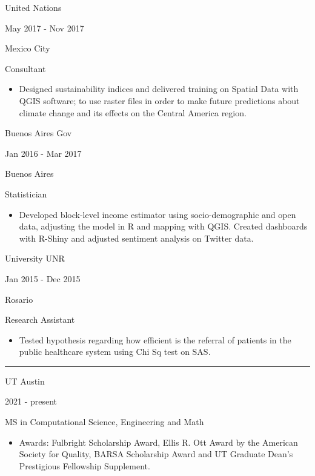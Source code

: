 \documentclass[a4paper,10pt]{article}
\newlength{\cvcolumngapwidth}
\newlength{\cvleftcolumnwidth}
\newlength{\cvrightcolumnwidth}
\newcommand{\cvsectionstyle}[1]{{\normalsize\cvsectionfont\textcolor{cvsectioncolor}{#1}}}
\newcommand{\cvtitlestyle}[1]{{\large\cvtitlefont\textcolor{cvtitlecolor}{#1}}}
\newcommand{\cvdurationstyle}[1]{{\small\cvdurationfont\textcolor{cvdurationcolor}{#1}}}
\newcommand{\cvheadingstyle}[1]{{\normalsize\cvheadingfont\textcolor{cvheadingcolor}{#1}}}
\newlength{\cvafteritemskipamount}
\newlength{\cvaftersectionskipamount}
\newlength{\cvaftertitleskipamount}
\newlength{\cvparskip}
\newcommand{\cvsection}[1]{
    \begin{minipage}[t]{\cvleftcolumnwidth}
        \raggedleft\cvsectionstyle{#1}
    \end{minipage}%
    \hspace{\cvcolumngapwidth}%
    \begin{minipage}[t]{\cvrightcolumnwidth}
        \textcolor{cvrulecolor}{\rule{\cvrightcolumnwidth}{0.3mm}}
    \end{minipage}

    \vspace{\cvaftersectionskipamount}
}
\newcommand{\cvitem}[2]{
    \begin{minipage}[t]{\cvleftcolumnwidth}
        \raggedleft #1
    \end{minipage}%
    \hspace{\cvcolumngapwidth}%
    \begin{minipage}[t]{\cvrightcolumnwidth}
        \setlength{\parskip}{\cvparskip} #2
    \end{minipage}

    \vspace{\cvafteritemskipamount}
}
\newcommand{\cvtitle}[1]{
    \cvtitlestyle{#1}

    \vspace{\cvaftertitleskipamount}
    \vspace{-\cvparskip}
}
\begin{document}
\cvitem{
    \cvheadingstyle{United Nations}

    \cvdurationstyle{May 2017 - Nov 2017}

    \cvdurationstyle{Mexico City}


}{
    \cvtitle{Consultant}

    \begin{itemize}[leftmargin=*]
        \item Designed sustainability indices and delivered training on Spatial Data with QGIS software; to use raster files in order to make future predictions about climate change and its effects on the Central America region.
    \end{itemize}
}


\cvitem{
    \cvheadingstyle{Buenos Aires Gov}

    \cvdurationstyle{Jan 2016 - Mar 2017}

    \cvdurationstyle{Buenos Aires}

}{
    \cvtitle{Statistician}


    \begin{itemize}[leftmargin=*]
        \item Developed block-level income estimator using socio-demographic and open data, adjusting the model in R and mapping with QGIS. Created dashboards with R-Shiny and adjusted sentiment analysis on Twitter data.

    \end{itemize}
}


\cvitem{
    \cvheadingstyle{University UNR}

    \cvdurationstyle{Jan 2015 - Dec 2015}

    \cvdurationstyle{Rosario}




}{
    \cvtitle{Research Assistant }

      \begin{itemize}[leftmargin=*]
        \item Tested hypothesis regarding how efficient is the referral of patients in the public healthcare system using Chi Sq test on SAS.


    \end{itemize}


}



\cvsection{EDUCATION}

\cvitem{
    \cvheadingstyle{UT Austin}

    \cvdurationstyle{2021 - present}
}{
    \cvtitle{MS in Computational Science, Engineering and Math}

    \begin{itemize}[leftmargin=*]
        \item Awards: Fulbright Scholarship Award, Ellis R. Ott Award by the American Society for Quality, BARSA Scholarship Award and UT Graduate Dean’s Prestigious Fellowship Supplement.
    \end{itemize}
}
\end{document}
